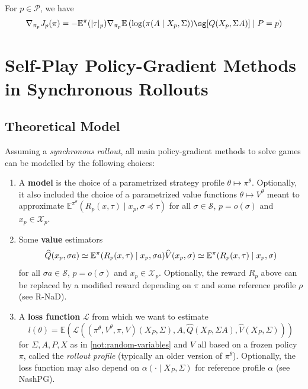 \documentclass[12pt, a4paper]{article}
\begin{document}
\begin{theorem}\label{thm:policy-gradient-games}
  For $p \in \mathcal{P}$, we have
  \begin{equation}\label{eq:policy-gradient-games}
    \nabla_{\pi_p} J_p(\pi)
    = - \mathbb{E}^\pi(|\tau|_{p}) \nabla_{\pi_p} \mathbb{E}\left(\log(\pi(A \mid X_p, \Sigma)) \sg[Q(X_p, \Sigma A)] \mid P = p\right)
  \end{equation}
\end{theorem}

\section{Self-Play Policy-Gradient Methods in Synchronous Rollouts}\label{sec:synchronous-pg}

\subsection{Theoretical Model}\label{subsec:pg-theoretical-model}

Assuming a \textit{synchronous rollout}, all main policy-gradient methods to solve games can be modelled by the following choices:
\begin{enumerate}
  \item A \textbf{model} is the choice of a parametrized strategy profile $\theta \mapsto \pi^\theta$.
  Optionally, it also included the choice of a parametrized value functions $\theta \mapsto V^\theta$ meant to approximate $\mathbb{E}^{\pi^\theta}(R_p(x,\tau) \mid x_p, \sigma \preccurlyeq \tau)$ for all $\sigma \in \mathcal{S}$, $p = o(\sigma)$ and $x_p \in \mathcal{X}_p$.

  \item Some \textbf{value} estimators 
  \[
    \widehat{Q}(x_p, \sigma a) \simeq \mathbb{E}^\pi(R_{p}(x,\tau) \mid x_p, \sigma a)
    \\
    \widehat{V}(x_p, \sigma) \simeq \mathbb{E}^\pi(R_{p}(x,\tau) \mid x_p, \sigma)
  \]
  for all $\sigma a \in \mathcal{S}$, $p = o(\sigma)$ and $x_p \in \mathcal{X}_p$. 
  Optionally, the reward $R_p$ above can be replaced by a modified reward depending on $\pi$ and some reference profile $\rho$ (see R-NaD).
  
  \item A \textbf{loss function} $\mathcal{L}$ from which we want to estimate
  \begin{equation}\label{eq:pg-loss-expectation}
    l(\theta) = \mathbb{E}\left(
      \mathcal{L}\left(
        (\pi^\theta, V^\theta,\pi, V)(X_P, \Sigma),
        A,
        \widehat{Q}(X_P, \Sigma A),
        \widehat{V}(X_P, \Sigma)
      \right)
    \right)
  \end{equation}
  for $\Sigma, A, P, X$ as in \autoref{not:random-variables} and $V$ all based on a frozen policy $\pi$, called the \textit{rollout profile} (typically an older version of $\pi^\theta$).
  Optionally, the loss function may also depend on $\alpha(\cdot \mid X_P, \Sigma)$ for reference profile $\alpha$ (see NashPG).
\end{enumerate}
\end{document}
